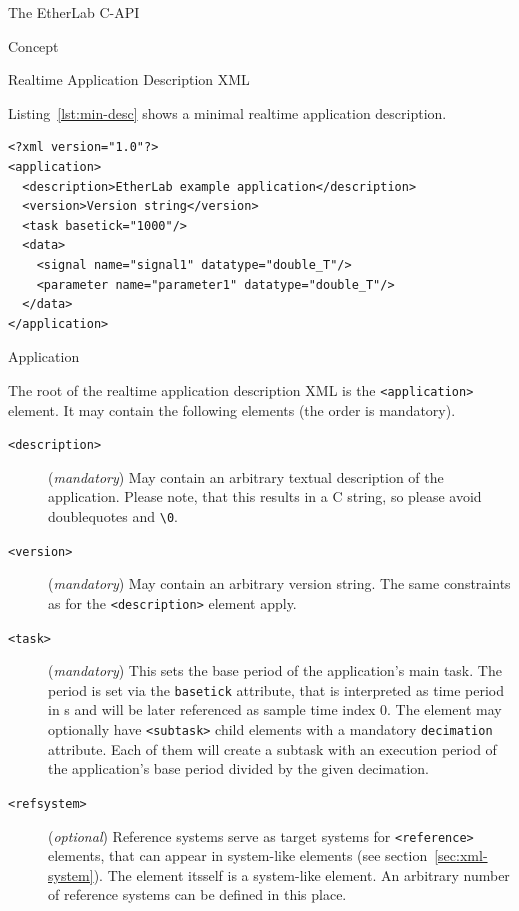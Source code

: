 \begin{ighsec}{The EtherLab C-API}
\begin{ighsec}{Concept}
\end{ighsec}

\begin{ighsec}{Realtime Application Description XML}
\label{sec:xml}

Listing~\ref{lst:min-desc} shows a minimal realtime application description.

\begin{lstlisting}[caption={Minimal realtime application description},
    label={lst:min-desc}]
<?xml version="1.0"?>
<application>
  <description>EtherLab example application</description>
  <version>Version string</version>
  <task basetick="1000"/>
  <data>
    <signal name="signal1" datatype="double_T"/>
    <parameter name="parameter1" datatype="double_T"/>
  </data>
</application>
\end{lstlisting}

\begin{ighsec}{Application}
\label{sec:xml-app}

The root of the realtime application description XML is the
\texttt{<application>} element. It may contain the following elements (the
order is mandatory).

\begin{description}

\item[\small\texttt{<description>}] (\textit{mandatory}) May contain an
arbitrary textual description of the application. Please note, that this
results in a C string, so please avoid doublequotes and \lstinline+\0+.

\item[\small\texttt{<version>}] (\textit{mandatory}) May contain an arbitrary
version string. The same constraints as for the \texttt{<description>}
element apply.

\item[\small\texttt{<task>}] (\textit{mandatory}) This sets the base period of
the application's main task. The period is set via the \texttt{basetick}
attribute, that is interpreted as time period in \textmu s and will be later
referenced as sample time index 0. The element may optionally have
\texttt{<subtask>} child elements with a mandatory \texttt{decimation}
attribute. Each of them will create a subtask with an execution period of the
application's base period divided by the given decimation.

\item[\small\texttt{<refsystem>}] (\textit{optional}) Reference systems serve
as target systems for \texttt{<reference>} elements, that can appear in
system-like elements (see section~\ref{sec:xml-system}). The element itsself
is a system-like element. An arbitrary number of reference systems can be
defined in this place.


\end{description}
\end{ighsec}
\end{ighsec}
\end{ighsec}
